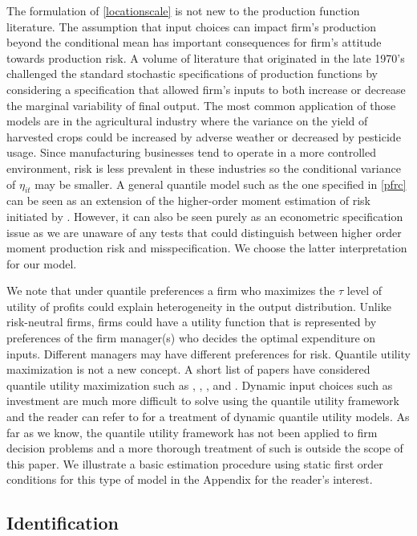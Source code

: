 \documentclass[11pt]{article}
\begin{document}
The formulation of \eqref{locationscale} is not new to the production function literature. The assumption that input choices can impact firm's production beyond the conditional mean has important consequences for firm's attitude towards production risk. A volume of literature that originated in the late 1970's challenged the standard stochastic specifications of production functions \citep{Just1978,Just1979} by considering a specification that allowed firm's inputs to both increase or decrease the marginal variability of final output. The most common application of those models are in the agricultural industry where the variance on the yield of harvested crops could be increased by adverse weather or decreased by pesticide usage. Since manufacturing businesses tend to operate in a more controlled environment, risk is less prevalent in these industries so the conditional variance of $\eta_{it}$ may be smaller. A general quantile model such as the one specified in \eqref{pfrc} can be seen as an extension of the higher-order moment estimation of risk initiated by \cite{Antle1983}. However, it can also be seen purely as an econometric specification issue as we are unaware of any tests that could distinguish between higher order moment production risk and misspecification. We choose the latter interpretation for our model. 

We note that under quantile preferences a firm who maximizes the $\tau$ level of utility of profits could explain heterogeneity in the output distribution. Unlike risk-neutral firms, firms could have a utility function that is represented by preferences of the firm manager(s) who decides the optimal expenditure on inputs. Different managers may have different preferences for risk. Quantile utility maximization is not a new concept. A short list of papers have considered quantile utility maximization such as \cite{Manski1988}, \cite{ROSTEK2009}, \cite{Chambers2007}, and \cite{Bhattacharya2009}. Dynamic input choices such as investment are much more difficult to solve using the quantile utility framework and the reader can refer to \cite{Castro2017} for a treatment of dynamic quantile utility models. As far as we know, the quantile utility framework has not been applied to firm decision problems and a more thorough treatment of such is outside the scope of this paper. We illustrate a basic estimation procedure using static first order conditions for this type of model in the Appendix for the reader's interest.

\subsection{Identification}
\end{document}
